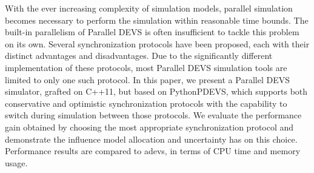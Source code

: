 With the ever increasing complexity of simulation models, parallel simulation
becomes necessary to perform the simulation within reasonable time bounds.
The built-in parallelism of Parallel DEVS is often insufficient to tackle this problem on its own.
Several synchronization protocols have been proposed, each with their distinct advantages and disadvantages.
Due to the significantly different implementation of these protocols, most Parallel DEVS simulation tools are limited to only one such protocol.
In this paper, we present a Parallel DEVS simulator, grafted on C++11, but based on PythonPDEVS, which supports both conservative and optimistic synchronization protocols with the capability to switch during simulation between those protocols.
We evaluate the performance gain obtained by choosing the most appropriate synchronization protocol and demonstrate the influence model allocation and uncertainty has on this choice. 
Performance results are compared to adevs, in terms of CPU time and memory usage.
